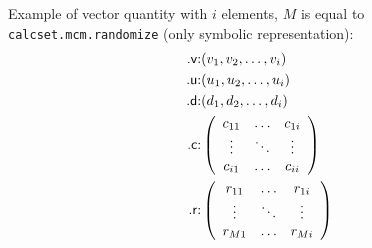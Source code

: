 \documentclass[12pt,a4paper,oneside]{report} %
\begin{document}
Example of vector quantity with $i$ elements, $M$ is equal to \lstinline{calcset.mcm.randomize} (only symbolic representation):
\begin{eqnarray*}
        \text{\textsf{.v}:} & (v_1, v_2, \dots, v_i) \\
        \text{\textsf{.u}:} & (u_1, u_2, \dots, u_i) \\
        \text{\textsf{.d}:} & (d_1, d_2, \dots, d_i) \\
        \text{\textsf{.c}:} & \left(    \begin{array}{ccc}
                                                c_{11}  & \hdots & c_{1i} \\
                                                \vdots  & \ddots & \vdots \\
                                                c_{i1}  & \hdots & c_{ii} \\
                                        \end{array}\right) \\
        \text{\textsf{.r}:} & \left(    \begin{array}{ccc}
                                                r_{11}  & \hdots & r_{1i} \\
                                                \vdots  & \ddots & \vdots \\
                                                r_{M1}  & \hdots & r_{Mi} \\
                                        \end{array}\right) \\
\end{eqnarray*}
\end{document}
